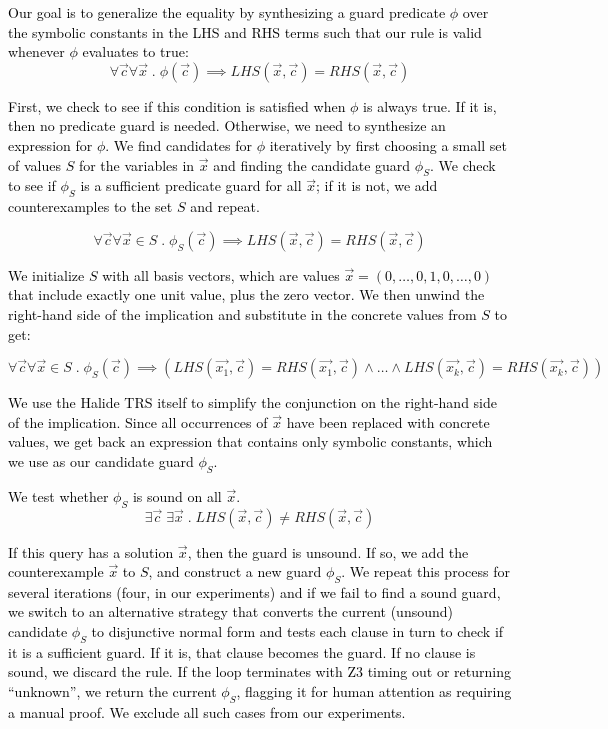 \documentclass[acmsmall]{acmart}\settopmatter{}
\newcommand{\modified}[1]{\textcolor{black}{{#1}}}
\begin{document}
\modified{Our goal is to generalize the equality by synthesizing a guard predicate $\phi$ 
over the symbolic constants in the LHS and RHS terms such that our rule is valid whenever
$\phi$ evaluates to true: }
\[ \forall \vec{c} \forall \vec{x} \;.\; \phi(\vec{c}) \implies LHS(\vec{x},\vec{c}) = RHS(\vec{x},\vec{c})
\]

\modified{First, we check to see if this condition is satisfied when $\phi$ is 
always true. If it is, then no predicate guard is needed. Otherwise, we need 
to synthesize an expression for $\phi$. We find candidates for $\phi$ iteratively 
by first choosing a small set of values $S$ for the variables 
in $\vec{x}$ and finding the candidate guard $\phi_S$. We check to see if $\phi_S$
is a sufficient predicate guard for all $\vec{x}$; if it is not, we add
counterexamples to the set $S$ and repeat.}

\[ \forall \vec{c} \forall \vec{x} \in S \;.\; \phi_S(\vec{c}) \implies LHS(\vec{x},\vec{c}) = RHS(\vec{x},\vec{c})
\]

\modified{We initialize $S$ with all basis vectors, which are 
values $\vec{x} = ( 0, \ldots, 0, 1, 0, \ldots, 0 )$ that include exactly one unit value,
plus the zero vector.  
We then unwind the right-hand side of the implication and substitute in the concrete values 
from $S$ to get:}

\[ \forall \vec{c} \forall \vec{x} \in S \;.\; \phi_S(\vec{c}) \implies (LHS(\vec{x_1},\vec{c}) = RHS(\vec{x_1},\vec{c}) \wedge \ldots \wedge
LHS(\vec{x_k},\vec{c}) = RHS(\vec{x_k},\vec{c}))
\]

\modified{We use the Halide TRS itself to simplify the conjunction on the right-hand side of the
implication. Since all occurrences of $\vec{x}$ have been replaced with concrete
values, we get back an expression that contains only symbolic constants, which we
use as our candidate guard $\phi_S$. }

\modified{We test whether $\phi_S$ is sound on all $\vec{x}$. }
\[ \exists \vec{c} \; \exists \vec{x} 
   \;.\; LHS(\vec{x},\vec{c}) \not= RHS(\vec{x},\vec{c})
\]

\modified{If this query has a solution $\vec{x}$, then the guard is unsound.  
If so, we add the counterexample $\vec{x}$ to $S$, and construct a new guard $\phi_S$.  
We repeat this process for several iterations (four, in our experiments) and if 
we fail to find a sound guard, we switch to an alternative strategy that converts 
the current (unsound) candidate $\phi_S$ to disjunctive normal form and tests
each clause in turn to check if it is a sufficient guard.
If it is, that clause becomes the guard.  If no clause is sound, we discard the rule.
If the loop terminates with Z3 timing out or returning ``unknown'', we return
the current $\phi_S$, flagging it for human attention as requiring a manual proof. 
We exclude all such cases from our experiments.}
\end{document}
